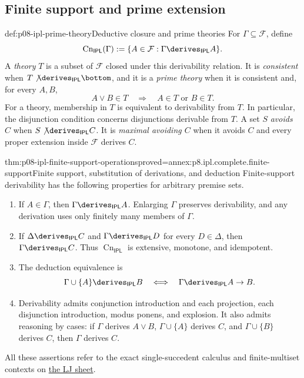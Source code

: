 \subsection{Finite support and prime extension}
\label{sec:p08-ipl-prime-extension}

\begin{hbdefinition}{def:p08-ipl-prime-theory}{Deductive closure and prime theories}
For \(\Gamma\subseteq\mathcal F\), define
\[
 \operatorname{Cn}_{\mathsf{IPL}}(\Gamma)
   :=\{A\in\mathcal F:\Gamma\derives_{\mathsf{IPL}}A\}.
\]
A \emph{theory} \(T\) is a subset of \(\mathcal F\) closed under this
derivability relation. It is \emph{consistent} when
\(T\not\derives_{\mathsf{IPL}}\bottom\), and it is a
\emph{prime theory} when it is consistent and, for every \(A,B\),
\[
 A\lor B\in T\quad\Longrightarrow\quad A\in T\text{ or }B\in T.
\]
For a theory, membership in \(T\) is equivalent to derivability from
\(T\). In particular, the disjunction condition concerns disjunctions
derivable from \(T\). A set \(S\) \emph{avoids \(C\)} when
\(S\not\derives_{\mathsf{IPL}}C\). It is \emph{maximal avoiding
\(C\)} when it avoids \(C\) and every proper extension inside
\(\mathcal F\) derives \(C\).
\end{hbdefinition}

\begin{hblemma}{thm:p08-ipl-finite-support-operations}{proved=annex:p8.ipl.complete.finite-support}{Finite support, substitution of derivations, and deduction}
Finite-support derivability has the following properties for arbitrary
premise sets.
\begin{enumerate}
\item If \(A\in\Gamma\), then \(\Gamma\derives_{\mathsf{IPL}}A\).
  Enlarging \(\Gamma\) preserves derivability, and any derivation uses
  only finitely many members of \(\Gamma\).
\item If \(\Delta\derives_{\mathsf{IPL}}C\) and
  \(\Gamma\derives_{\mathsf{IPL}}D\) for every \(D\in\Delta\),
  then \(\Gamma\derives_{\mathsf{IPL}}C\).
  Thus \(\operatorname{Cn}_{\mathsf{IPL}}\) is extensive, monotone,
  and idempotent.
\item The deduction equivalence is
  \[
   \Gamma\cup\{A\}\derives_{\mathsf{IPL}}B
   \quad\Longleftrightarrow\quad
   \Gamma\derives_{\mathsf{IPL}}A\to B.
  \]
\item Derivability admits conjunction introduction and each projection,
  each disjunction introduction, modus ponens, and explosion. It also
  admits reasoning by cases: if \(\Gamma\) derives \(A\lor B\),
  \(\Gamma\cup\{A\}\) derives \(C\), and
  \(\Gamma\cup\{B\}\) derives \(C\), then \(\Gamma\) derives
  \(C\).
\end{enumerate}
All these assertions refer to the exact single-succedent calculus and
finite-multiset contexts on \hyperref[sheet:lj]{the LJ sheet}.
\end{hblemma}

